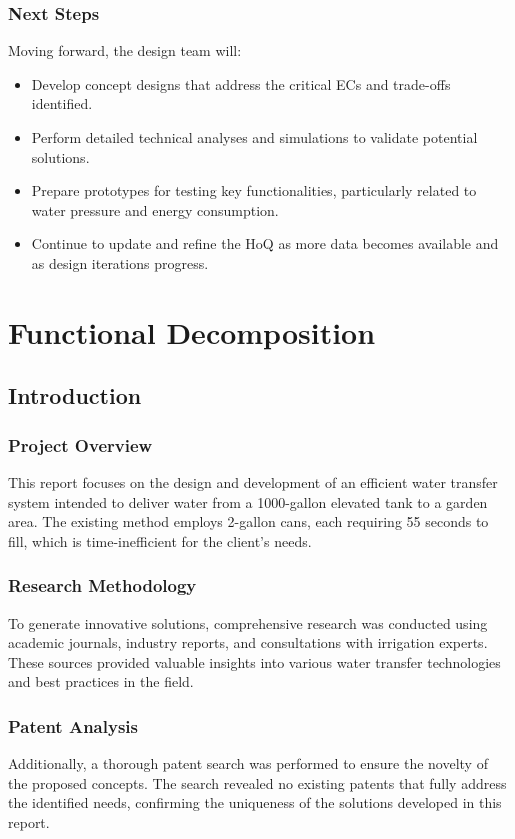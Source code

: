 \documentclass[12pt]{report}
\begin{document}
\subsection{Next Steps}

Moving forward, the design team will:

\begin{itemize}
    \item Develop concept designs that address the critical ECs and trade-offs identified.
    \item Perform detailed technical analyses and simulations to validate potential solutions.
    \item Prepare prototypes for testing key functionalities, particularly related to water pressure and energy consumption.
    \item Continue to update and refine the HoQ as more data becomes available and as design iterations progress.

\end{itemize}




\chapter{Functional Decomposition}
\section{Introduction}

\subsection{Project Overview}
This report focuses on the design and development of an efficient water transfer system intended to deliver water from a 1000-gallon elevated tank to a garden area. The existing method employs 2-gallon cans, each requiring 55 seconds to fill, which is time-inefficient for the client's needs.

\subsection{Research Methodology}
To generate innovative solutions, comprehensive research was conducted using academic journals, industry reports, and consultations with irrigation experts. These sources provided valuable insights into various water transfer technologies and best practices in the field.

\subsection{Patent Analysis}
Additionally, a thorough patent search was performed to ensure the novelty of the proposed concepts. The search revealed no existing patents that fully address the identified needs, confirming the uniqueness of the solutions developed in this report.
\end{document}

